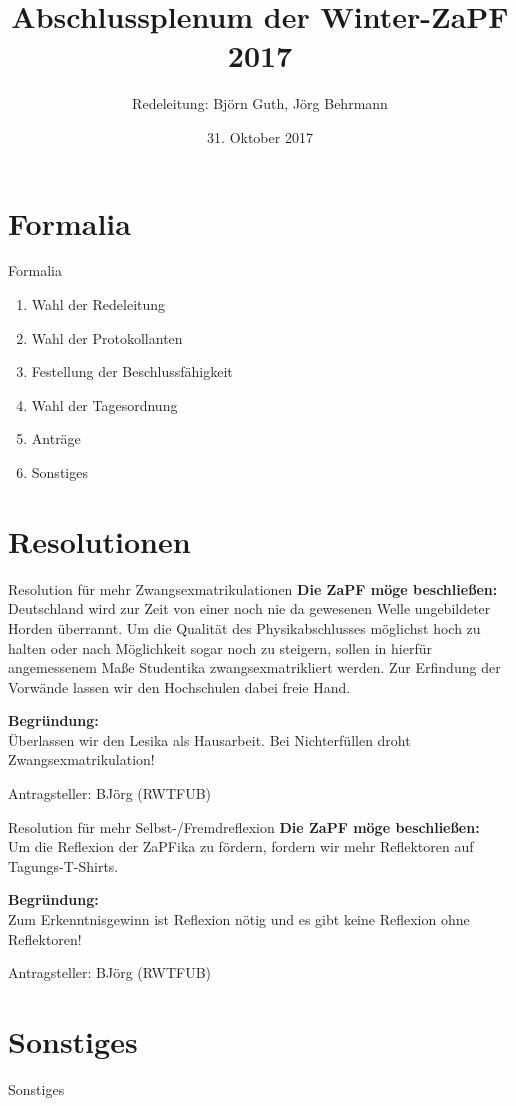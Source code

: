 \documentclass[compress,aspectratio=169]{beamer}
\title[Abschlussplenum WiSe17]{Abschlussplenum der Winter-ZaPF 2017}
\author{Redeleitung: Björn Guth, Jörg Behrmann}
\institute[Zusammenkunft aller Physikfachschaften]
\date{31. Oktober 2017}
\begin{document}
\begin{frame}[plain]{}
  \titlepage
\end{frame}

\section{Formalia}
\begin{frame}{Formalia}
	\begin{enumerate}
		\item Wahl der Redeleitung
		\item Wahl der Protokollanten
		\item Festellung der Beschlussfähigkeit
		\item Wahl der Tagesordnung
		\item Anträge
		\item Sonstiges
	\end{enumerate}
\end{frame}

\section{Resolutionen}
\begin{frame}{Resolution für mehr Zwangsexmatrikulationen}
	\textbf{Die ZaPF möge beschließen:}\\
	Deutschland wird zur Zeit von einer noch nie da gewesenen Welle
	ungebildeter Horden überrannt. Um die Qualität des Physikabschlusses
	möglichst hoch zu halten oder nach Möglichkeit sogar noch zu steigern,
	sollen in hierfür angemessenem Maße Studentika zwangsexmatrikliert werden.
	Zur Erfindung der Vorwände lassen wir den Hochschulen dabei freie Hand.

	\textbf{Begründung:}\\
	Überlassen wir den Lesika als Hausarbeit. Bei Nichterfüllen droht
	Zwangsexmatrikulation!

	\hfill Antragsteller: BJörg (RWTFUB)
\end{frame}

\begin{frame}{Resolution für mehr Selbst-/Fremdreflexion}
	\textbf{Die ZaPF möge beschließen:}\\
	Um die Reflexion der ZaPFika zu fördern, fordern wir mehr Reflektoren auf
	Tagungs-T-Shirts.

	\textbf{Begründung:}\\
	Zum Erkenntnisgewinn ist Reflexion nötig und es gibt keine Reflexion ohne
	Reflektoren!

	\hfill Antragsteller: BJörg (RWTFUB)
\end{frame}

\section{Sonstiges}
\begin{frame}{Sonstiges}
\end{frame}
\end{document}
